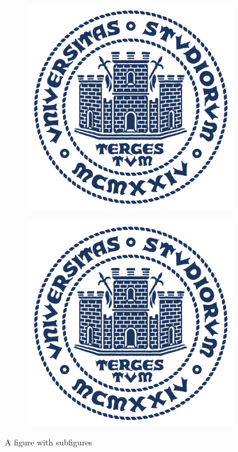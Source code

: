 \begin{figure}[h]
\begin{subfigure}[t]{0.5\textwidth}
        \end{subfigure}
        \begin{subfigure}[t]{0.5\textwidth}
            \includegraphics[width=0.9\linewidth]{img/units_sigillo_pantone-534}
        \end{subfigure}
        \begin{subfigure}[t]{0.5\textwidth}
            \includegraphics[width=0.9\linewidth]{img/units_sigillo_pantone-534}
        \end{subfigure}
        \caption{A figure with subfigures}
        \label{fig:subexample}
    \end{figure}

